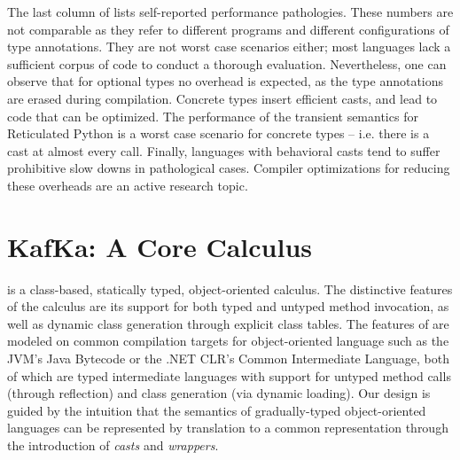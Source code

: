 \documentclass[a4paper,USenglish]{tex/lipics-v2016}
\begin{document}
The last column of  lists self-reported performance
pathologies.  These numbers are not comparable as they refer to different
programs and different configurations of type annotations. They are not
worst case scenarios either; most languages lack a sufficient corpus of code
to conduct a thorough evaluation.  Nevertheless, one can observe that for
optional types no overhead is expected, as the type annotations are erased
during compilation. Concrete types insert efficient casts, and lead to code
that can be optimized.  The performance of the transient semantics for
Reticulated Python is a worst case scenario for concrete types -- i.e. there
is a cast at almost every call. Finally, languages with behavioral casts
tend to suffer prohibitive slow downs in pathological cases. Compiler
optimizations for reducing these overheads are an active research topic.


\section{KafKa: A Core Calculus}\label{kafkacore}


\noindent \kafka is a class-based, statically typed, object-oriented
calculus. The distinctive features of the calculus are its support for both
typed and untyped method invocation, as well as dynamic class generation
through explicit class tables.  The features of \kafka are modeled on common
compilation targets for object-oriented language such as the JVM's Java
Bytecode or the .NET CLR's Common Intermediate Language, both of which are
typed intermediate languages with support for untyped method calls (through
reflection) and class generation (via dynamic loading). Our design is guided
by the intuition that the semantics of gradually-typed object-oriented
languages can be represented by translation to a common representation
through the introduction of \emph{casts} and \emph{wrappers}.
\end{document}
